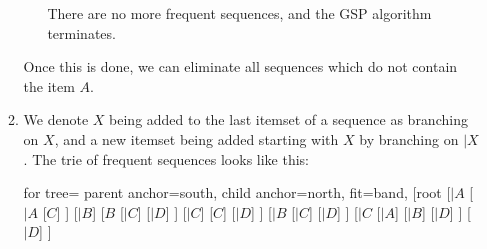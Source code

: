 \documentclass[pdf]{article}
\begin{document}
\begin{enumerate}
\begin{enumerate}
\begin{itemize}
			There are no more frequent sequences, and the GSP algorithm terminates.
		\end{itemize}
		Once this is done, we can eliminate all sequences which do not contain the item \(A\).
		\item We denote \(X\) being added to the last itemset of a sequence as branching on \(X\), and a new itemset being added starting with \(X\) by branching on \(\vert X\).
		The trie of frequent sequences looks like this:
		\begin{center}
			\begin{forest}
				for tree={
					parent anchor=south,
					child anchor=north,
					fit=band,%
				}
				[root
						[\(\vert A\)
							[\(\vert A\)
								[\(C\)]
							]
							[\(\vert B\)]
							[\(B\)
								[\(\vert C\)]
								[\(\vert D\)]
							]
							[\(\vert C\)]
							[\(C\)]
							[\(\vert D\)]
						]
						[\(\vert B\)
							[\(\vert C\)]
							[\(\vert D\)]
						]
						[\(\vert C\)
							[\(\vert A\)]
							[\(\vert B\)]
							[\(\vert D\)]
						]
						[\(\vert D\)]
				]
			\end{forest}
		\end{center}
	\end{enumerate}
\end{enumerate}
\end{document}

